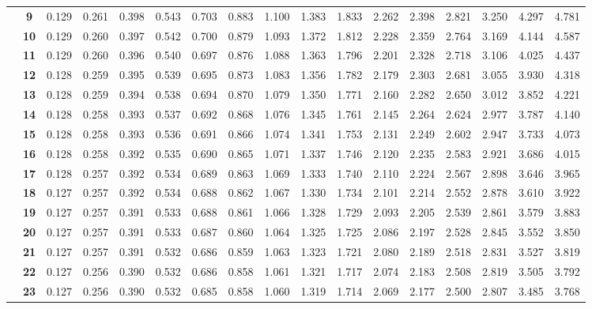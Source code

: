 {\begin{tabular}{cc|ccccccccccccccc}
    & \textbf{9} & 0.129 & 0.261 & 0.398 & 0.543 & 0.703 & 0.883 & 1.100 & 1.383 & 1.833 & 2.262 & 2.398 & 2.821 & 3.250 & 4.297 & 4.781 \\
    & \textbf{10} & 0.129 & 0.260 & 0.397 & 0.542 & 0.700 & 0.879 & 1.093 & 1.372 & 1.812 & 2.228 & 2.359 & 2.764 & 3.169 & 4.144 & 4.587 \\
    & \textbf{11} & 0.129 & 0.260 & 0.396 & 0.540 & 0.697 & 0.876 & 1.088 & 1.363 & 1.796 & 2.201 & 2.328 & 2.718 & 3.106 & 4.025 & 4.437 \\
    & \textbf{12} & 0.128 & 0.259 & 0.395 & 0.539 & 0.695 & 0.873 & 1.083 & 1.356 & 1.782 & 2.179 & 2.303 & 2.681 & 3.055 & 3.930 & 4.318 \\
    & \textbf{13} & 0.128 & 0.259 & 0.394 & 0.538 & 0.694 & 0.870 & 1.079 & 1.350 & 1.771 & 2.160 & 2.282 & 2.650 & 3.012 & 3.852 & 4.221 \\
    & \textbf{14} & 0.128 & 0.258 & 0.393 & 0.537 & 0.692 & 0.868 & 1.076 & 1.345 & 1.761 & 2.145 & 2.264 & 2.624 & 2.977 & 3.787 & 4.140 \\
    & \textbf{15} & 0.128 & 0.258 & 0.393 & 0.536 & 0.691 & 0.866 & 1.074 & 1.341 & 1.753 & 2.131 & 2.249 & 2.602 & 2.947 & 3.733 & 4.073 \\
    & \textbf{16} & 0.128 & 0.258 & 0.392 & 0.535 & 0.690 & 0.865 & 1.071 & 1.337 & 1.746 & 2.120 & 2.235 & 2.583 & 2.921 & 3.686 & 4.015 \\
    & \textbf{17} & 0.128 & 0.257 & 0.392 & 0.534 & 0.689 & 0.863 & 1.069 & 1.333 & 1.740 & 2.110 & 2.224 & 2.567 & 2.898 & 3.646 & 3.965 \\
    & \textbf{18} & 0.127 & 0.257 & 0.392 & 0.534 & 0.688 & 0.862 & 1.067 & 1.330 & 1.734 & 2.101 & 2.214 & 2.552 & 2.878 & 3.610 & 3.922 \\
    & \textbf{19} & 0.127 & 0.257 & 0.391 & 0.533 & 0.688 & 0.861 & 1.066 & 1.328 & 1.729 & 2.093 & 2.205 & 2.539 & 2.861 & 3.579 & 3.883 \\
    & \textbf{20} & 0.127 & 0.257 & 0.391 & 0.533 & 0.687 & 0.860 & 1.064 & 1.325 & 1.725 & 2.086 & 2.197 & 2.528 & 2.845 & 3.552 & 3.850 \\
    & \textbf{21} & 0.127 & 0.257 & 0.391 & 0.532 & 0.686 & 0.859 & 1.063 & 1.323 & 1.721 & 2.080 & 2.189 & 2.518 & 2.831 & 3.527 & 3.819 \\
    & \textbf{22} & 0.127 & 0.256 & 0.390 & 0.532 & 0.686 & 0.858 & 1.061 & 1.321 & 1.717 & 2.074 & 2.183 & 2.508 & 2.819 & 3.505 & 3.792 \\
    & \textbf{23} & 0.127 & 0.256 & 0.390 & 0.532 & 0.685 & 0.858 & 1.060 & 1.319 & 1.714 & 2.069 & 2.177 & 2.500 & 2.807 & 3.485 & 3.768 \\

\end{tabular}}
